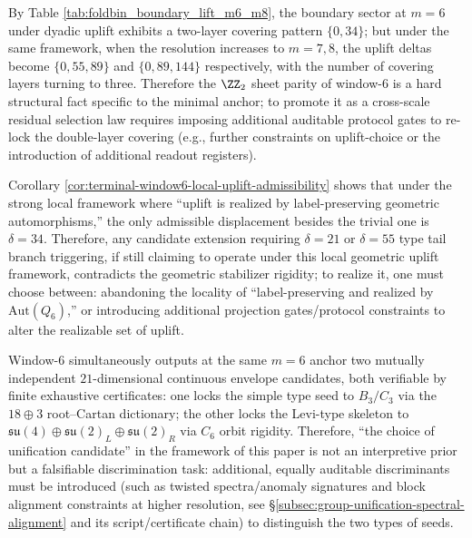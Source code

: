 \begin{remark}\label{rem:window6-sheet-parity-nonpersistent}
By Table \ref{tab:foldbin_boundary_lift_m6_m8}, the boundary sector at \(m=6\) under dyadic uplift exhibits a two-layer covering pattern \(\{0,34\}\);
but under the same framework, when the resolution increases to \(m=7,8\), the uplift deltas become \(\{0,55,89\}\) and \(\{0,89,144\}\) respectively, with the number of covering layers turning to three.
Therefore the \(\ZZ_2\) sheet parity of window-\(6\) is a hard structural fact specific to the minimal anchor; to promote it as a cross-scale residual selection law requires imposing additional auditable protocol gates to re-lock the double-layer covering (e.g., further constraints on uplift-choice or the introduction of additional readout registers).
\end{remark}

\begin{remark}[Falsifiable boundary under local uplift framework: \texorpdfstring{$\delta\neq 34$}{delta!=34} necessarily forces non-local externalization]\label{rem:window6-local-uplift-falsifiable-boundary}
Corollary \ref{cor:terminal-window6-local-uplift-admissibility} shows that under the strong local framework where ``uplift is realized by label-preserving geometric automorphisms,'' the only admissible displacement besides the trivial one is \(\delta=34\).
Therefore, any candidate extension requiring \(\delta=21\) or \(\delta=55\) type tail branch triggering, if still claiming to operate under this local geometric uplift framework, contradicts the geometric stabilizer rigidity;
to realize it, one must choose between: abandoning the locality of ``label-preserving and realized by \(\mathrm{Aut}(Q_6)\),'' or introducing additional projection gates/protocol constraints to alter the realizable set of uplift.
\end{remark}

\begin{remark}\label{rem:window6-dim21-double-seed-bifurcation}
Window-\(6\) simultaneously outputs at the same \(m=6\) anchor two mutually independent \(21\)-dimensional continuous envelope candidates, both verifiable by finite exhaustive certificates:
one locks the simple type seed to \(B_3/C_3\) via the \(18\oplus 3\) root--Cartan dictionary;
the other locks the Levi-type skeleton to \(\mathfrak{su}(4)\oplus\mathfrak{su}(2)_L\oplus\mathfrak{su}(2)_R\) via \(C_6\) orbit rigidity.
Therefore, ``the choice of unification candidate'' in the framework of this paper is not an interpretive prior but a falsifiable discrimination task: additional, equally auditable discriminants must be introduced (such as twisted spectra/anomaly signatures and block alignment constraints at higher resolution, see \S\ref{subsec:group-unification-spectral-alignment} and its script/certificate chain) to distinguish the two types of seeds.
\end{remark}

